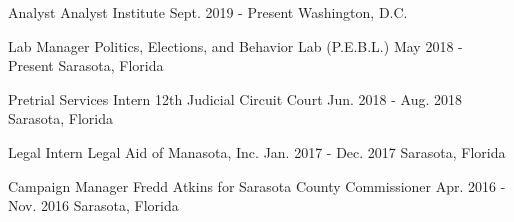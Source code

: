 

\begin{cventries}

    \cventry
      {Analyst} %
      {Analyst Institute} %
      {Sept. 2019 - Present} %
      {Washington, D.C.} %
      {}

  \vspace{-.25cm}

  \cventry
    {Lab Manager} %
    {Politics, Elections, and Behavior Lab (P.E.B.L.)} %
    {May 2018 - Present} %
    {Sarasota, Florida} %
    {}

\vspace{-.25cm}
  \cventry
    {Pretrial Services Intern} %
    {12th Judicial Circuit Court} %
    {Jun. 2018 - Aug. 2018} %
    {Sarasota, Florida} %
    {}

\vspace{-.25cm}
  \cventry
    {Legal Intern} %
    {Legal Aid of Manasota, Inc.} %
    {Jan. 2017 - Dec. 2017} %
    {Sarasota, Florida} %
    {}

\vspace{-.25cm}
  \cventry
    {Campaign Manager} %
    {Fredd Atkins for Sarasota County Commissioner} %
    {Apr. 2016 - Nov. 2016} %
    {Sarasota, Florida} %
    {}

\vspace{-.25cm}
\end{cventries}
